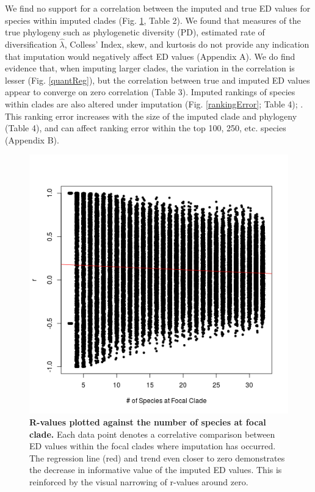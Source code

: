 \documentclass[12pt,english]{article}
\begin{document}
We find no support for a correlation between the imputed and true ED values for
species within imputed clades (Fig. \ref{imputationTrend}, Table 2). We found
that measures of the true phylogeny such as phylogenetic diversity (PD), estimated rate of diversification $\hat{\lambda}$,
Colless' Index, skew, and kurtosis
do not provide any indication that imputation
would negatively affect ED values (Appendix A). We do find evidence that, when
imputing larger clades, the variation in the correlation is lesser
(Fig. \ref{quantReg}), but the correlation between true and imputed ED values appear
to converge on zero correlation (Table 3).
Imputed rankings of species within clades are also altered
under imputation (Fig. \ref{rankingError}; Table 4); .
This ranking error increases with the size of the imputed clade and
phylogeny (Table 4), and can affect ranking error within the top 100,
250, etc. species (Appendix B).

\begin{figure}[!ht]
  \center
  \includegraphics[width=.5\textwidth]{edModel.png}
  \caption{\textbf{R-values plotted against the number of species at focal
  clade.} Each data point denotes a correlative comparison between ED values
  within the focal clades where imputation has occurred. The regression line
  (red) and trend even closer to zero demonstrates the decrease in informative
  value of the imputed ED values. This is reinforced by the visual narrowing of
  r-values around zero.}
  \label{imputationTrend}
\end{figure}
\end{document}
